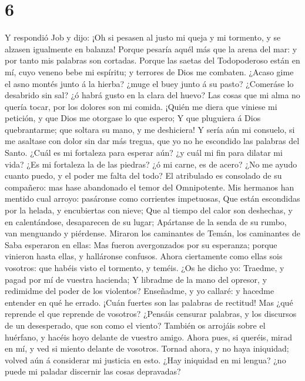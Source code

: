 \hypertarget{section-5}{%
\section{6}\label{section-5}}

 Y respondió Job y dijo:  ¡Oh si pesasen al
justo mi queja y mi tormento, y se alzasen igualmente en balanza!
 Porque pesaría aquél más que la arena del mar: y por
tanto mis palabras son cortadas.  Porque las saetas del
Todopoderoso están en mí, cuyo veneno bebe mi espíritu; y terrores de
Dios me combaten.  ¿Acaso gime el asno montés junto á la
hierba? ¿muge el buey junto á su pasto?  ¿Comeráse lo
desabrido sin sal? ¿ó habrá gusto en la clara del huevo? 
Las cosas que mi alma no quería tocar, por los dolores son mi comida.
 ¡Quién me diera que viniese mi petición, y que Dios me
otorgase lo que espero;  Y que pluguiera á Dios
quebrantarme; que soltara su mano, y me deshiciera!  Y
sería aún mi consuelo, si me asaltase con dolor sin dar más tregua, que
yo no he escondido las palabras del Santo.  ¿Cuál es mi
fortaleza para esperar aún? ¿y cuál mi fin para dilatar mi vida?
 ¿Es mi fortaleza la de las piedras? ¿ó mi carne, es de
acero?  ¿No me ayudo cuanto puedo, y el poder me falta
del todo?  El atribulado es consolado de su compañero:
mas hase abandonado el temor del Omnipotente.  Mis
hermanos han mentido cual arroyo: pasáronse como corrientes impetuosas,
 Que están escondidas por la helada, y encubiertas con
nieve;  Que al tiempo del calor son deshechas, y en
calentándose, desaparecen de su lugar;  Apártanse de la
senda de su rumbo, van menguando y piérdense.  Miraron
los caminantes de Temán, los caminantes de Saba esperaron en ellas:
 Mas fueron avergonzados por su esperanza; porque
vinieron hasta ellas, y halláronse confusos.  Ahora
ciertamente como ellas sois vosotros: que habéis visto el tormento, y
teméis.  ¿Os he dicho yo: Traedme, y pagad por mí de
vuestra hacienda;  Y libradme de la mano del opresor, y
redimidme del poder de los violentos?  Enseñadme, y yo
callaré: y hacedme entender en qué he errado.  ¡Cuán
fuertes son las palabras de rectitud! Mas ¿qué reprende el que reprende
de vosotros?  ¿Pensáis censurar palabras, y los discursos
de un desesperado, que son como el viento?  También os
arrojáis sobre el huérfano, y hacéis hoyo delante de vuestro amigo.
 Ahora pues, si queréis, mirad en mí, y ved si miento
delante de vosotros.  Tornad ahora, y no haya iniquidad;
volved aún á considerar mi justicia en esto.  ¿Hay
iniquidad en mi lengua? ¿no puede mi paladar discernir las cosas
depravadas?


